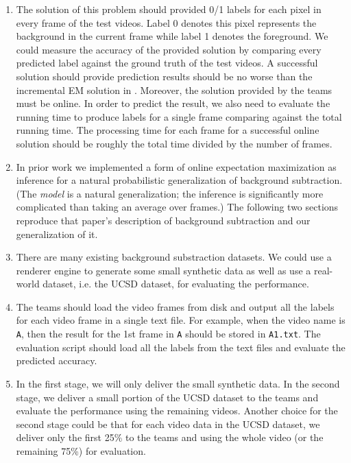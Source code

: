 \begin{enumerate}[i]
\item The solution of this problem should provided 0/1 labels for each pixel in every frame of the test videos. Label 0 denotes this pixel represents the background in the current frame while label 1 denotes the foreground. We could measure the accuracy of the provided solution by comparing every predicted label against the ground truth of the test videos. A successful solution should provide prediction results should be no worse than the incremental EM solution in \cite{friedman1997image}.
    Moreover, the solution provided by the teams must be online. In order to predict the result, we also need to evaluate the running time to produce labels for a single frame comparing against the total running time. The processing time for each frame for a successful online solution should be roughly the total time divided by the number of frames.
\item In prior work we implemented a form of online expectation
  maximization as inference for a natural probabilistic
  generalization of background subtraction\cite{friedman1997image}.
  (The \emph{model} is a natural 
  generalization; the inference is significantly more
  complicated than taking an average over frames.)  The following two sections
  reproduce that paper's description of background subtraction and our
  generalization of it.
\item There are many existing background substraction datasets. We could use a renderer engine to generate some small synthetic data as well as use a real-world dataset, i.e. the UCSD dataset, for evaluating the performance.
\item The teams should load the video frames from disk and output all the labels for each video frame in a single text file. For example, when the video name is \texttt{A}, then the result for the 1st frame in \texttt{A} should be stored in \texttt{A1.txt}. The evaluation script should load all the labels from the text files and evaluate the predicted accuracy.
\item In the first stage, we will only deliver the small synthetic data. In the second stage, we deliver a small portion of the UCSD dataset to the teams and evaluate the performance using the remaining videos. Another choice for the second stage could be that for each video data in the UCSD dataset, we deliver only the first 25\% to the teams and using the whole video (or the remaining 75\%) for evaluation.
\end{enumerate}


